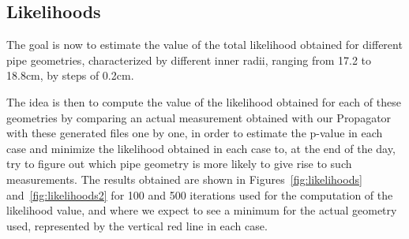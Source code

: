 \documentclass[a4paper, 11pt]{report}
\begin{document}
\subsection{Likelihoods}

The goal is now to estimate the value of the total likelihood obtained for different pipe geometries, characterized by different inner radii, ranging from 17.2 to 18.8cm, by steps of 0.2cm.

The idea is then to compute the value of the likelihood obtained for each of these geometries by comparing an actual measurement obtained with our Propagator with these generated files one by one, in order to estimate the p-value in each case and minimize the likelihood obtained in each case to, at the end of the day, try to figure out which pipe geometry is more likely to give rise to such measurements. The results obtained are shown in Figures~\ref{fig:likelihoods} and~\ref{fig:likelihoods2} for 100 and 500 iterations used for the computation of the likelihood value, and where we expect to see a minimum for the actual geometry used, represented by the vertical red line in each case.
\end{document}
